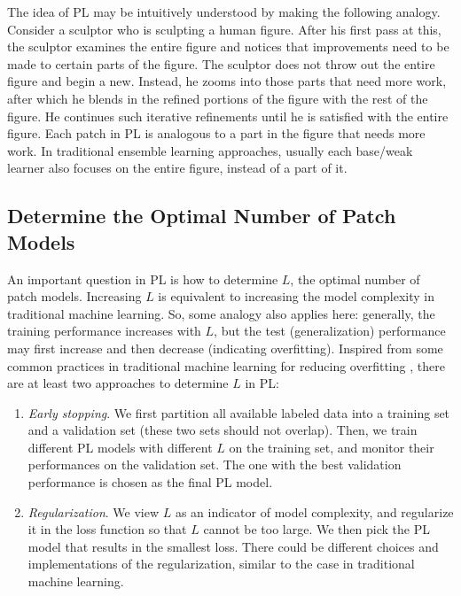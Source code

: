 \documentclass[journal,twocolumn]{IEEEtran}
\begin{document}
The idea of PL may be intuitively understood by making the following analogy. Consider a sculptor who is sculpting a human figure. After his first pass at this, the sculptor examines the entire figure and notices that improvements need to be made to certain parts of the figure. The sculptor does not throw out the entire figure and begin a new. Instead, he zooms into those parts that need more work, after which he blends in the refined portions of the figure with the rest of the figure. He continues such iterative refinements until he is satisfied with the entire figure. Each patch in PL is analogous to a part in the figure that needs more work. In traditional ensemble learning approaches, usually each base/weak learner also focuses on the entire figure, instead of a part of it.

\subsection{Determine the Optimal Number of Patch Models}

An important question in PL is how to determine $L$, the optimal number of patch models. Increasing $L$ is equivalent to increasing the model complexity in traditional machine learning. So, some analogy also applies here: generally, the training performance increases with $L$, but the test (generalization) performance may first increase and then decrease (indicating overfitting). Inspired from some common practices in traditional machine learning for reducing overfitting \cite{Duda2000,Hastie2009}, there are at least two approaches to determine $L$ in PL:
\begin{enumerate}
\item \emph{Early stopping}. We first partition all available labeled data into a training set and a validation set (these two sets should not overlap). Then, we train different PL models with different $L$ on the training set, and monitor their performances on the validation set. The one with the best validation performance is chosen as the final PL model.
\item \emph{Regularization}. We view $L$ as an indicator of model complexity, and regularize it in the loss function so that $L$ cannot be too large. We then pick the PL model that results in the smallest loss. There could be different choices and implementations of the regularization, similar to the case in traditional machine learning.
\end{enumerate}
\end{document}
